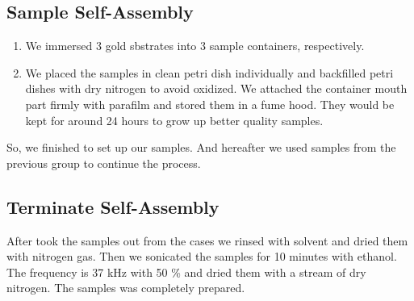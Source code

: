 \subsection{Sample Self-Assembly}
\begin{enumerate}
 \item We immersed 3 gold sbstrates into 3 sample containers, respectively.  
 \item We placed the samples in clean petri dish individually and backfilled petri dishes with dry nitrogen to avoid oxidized. We attached the container mouth part firmly with parafilm and stored them in a fume hood. They would be kept for around 24 hours to grow up better quality samples.
\end{enumerate}
So, we finished to set up our samples. And hereafter we used samples from the previous group to continue the process.


\subsection{Terminate Self-Assembly}
After took the samples out from the cases we rinsed with solvent and dried them with nitrogen gas. Then we sonicated the samples for 10 minutes with ethanol. The frequency is 37 kHz with 50 \% and dried them with a stream of dry nitrogen. The samples was completely prepared.


